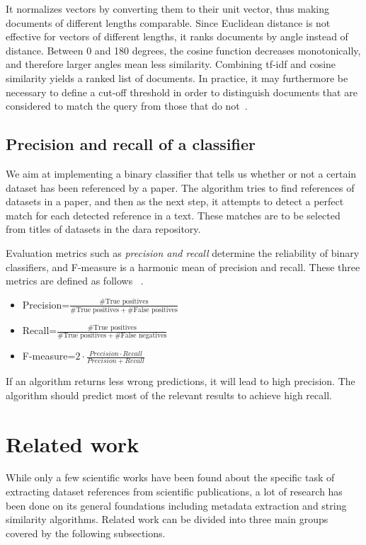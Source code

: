 \documentclass{IOS-Book-Article}
\newcommand{\dara}{\textsf{da\textbar ra}}
\begin{document}
It normalizes vectors by converting them to their unit vector, thus making documents of different lengths comparable.
Since Euclidean distance is not effective for vectors of different lengths, it ranks documents by angle instead of distance.
Between 0 and 180 degrees, the cosine function decreases monotonically, and therefore larger angles mean less similarity.
Combining tf-idf and cosine similarity yields a ranked list of documents.
In practice, it may furthermore be necessary to define a cut-off threshold in order to distinguish documents that are considered to match the query from those that do not~\citep{Joachims1997}.

\subsection{Precision and recall of a classifier}
\label{sec:precision-recall}
We aim at implementing a binary classifier that tells us whether or not a certain dataset has been referenced by a paper. The algorithm tries to find references of datasets in a paper, and then as the next step, it attempts to detect a perfect match for each detected reference in a text. These matches are to be selected from titles of datasets in the {\dara} repository. 

Evaluation metrics such as \emph{precision and recall} determine the reliability of binary classifiers, and F-measure is a harmonic mean of precision and recall. 
These three metrics are defined as follows ~\cite{Powers2011}. 
\begin{itemize}
	\item Precision=$\frac{\#\text{True\ positives}}{\#\text{True positives}+\#\text{False positives}}$
	\item Recall=$\frac{\#\text{True positives}}{\#\text{True positives}+\#\text{False negatives}}$
	\item F-measure=$2\cdot{\frac{\mathit{Precision}\cdot\mathit{Recall}}{\mathit{Precision}+\mathit{Recall}}}$
\end{itemize}

If an algorithm returns less wrong predictions, it will lead to high precision. The algorithm should predict most of the relevant results to achieve high recall.

\section{Related work}
\label{sec:relWork}
While only a few scientific works have been found about the specific task of extracting dataset references from scientific publications, a lot of research has been done on its general foundations including metadata extraction and string similarity algorithms. 
Related work can be divided into three main groups covered by the following subsections.
\end{document}
